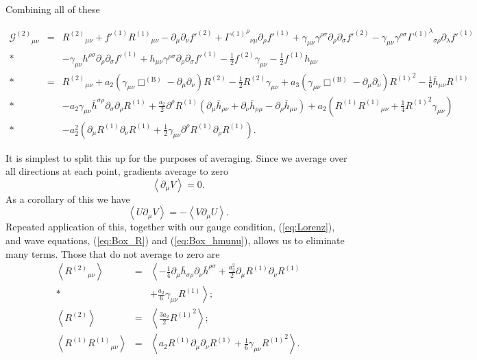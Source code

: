 \documentclass[aps,prd,amsfonts,amssymb,amsmath,nofootinbib,reprint,showpacs]{revtex4-1}
\newcommand{\eqnref}[1]{(\ref{eq:#1})}
\newcommand{\recip}[1]{\ensuremath{\frac{1}{#1}}}
\begin{document}
Combining all of these
\begin{widetext}
\begin{eqnarray}
{\mathcal{G}^{(2)}}_{\mu\nu} & = & {R^{(2)}}_{\mu\nu} + f'^{(1)}{R^{(1)}}_{\mu\nu} - \partial_\mu\partial_\nu f'^{(2)} + {{\Gamma^{(1)}}^\rho}_{\nu\mu}\partial_\rho f'^{(1)} + \gamma_{\mu\nu}\gamma^{\rho\sigma}\partial_\rho\partial_\sigma f'^{(2)} - \gamma_{\mu\nu}\gamma^{\rho\sigma}{{\Gamma^{(1)}}^\lambda}_{\sigma\rho}\partial_\lambda f'^{(1)} \nonumber \\*
 & & - {} \gamma_{\mu\nu}h^{\rho\sigma}\partial_\rho\partial_\sigma f'^{(1)} + h_{\mu\nu}\gamma^{\rho\sigma}\partial_\rho\partial_\sigma f'^{(1)} - \recip{2}f^{(2)}\gamma_{\mu\nu} - \recip{2}f^{(1)}h_{\mu\nu} \nonumber \\*
 & = & {R^{(2)}}_{\mu\nu} + a_2\left(\gamma_{\mu\nu}\Box^{(\text{B})} - \partial_\mu\partial_\nu\right)R^{(2)} - \recip{2}R^{(2)}\gamma_{\mu\nu} + a_3\left(\gamma_{\mu\nu}\Box^{(\text{B})} - \partial_\mu\partial_\nu\right){R^{(1)}}^2 - \recip{6}\overline{h}_{\mu\nu}R^{(1)} \nonumber \\*
 & & - {} a_2\gamma_{\mu\nu}\overline{h}^{\sigma\rho}\partial_\sigma\partial_\rho R^{(1)} + \frac{a_2}{2} \partial^\rho R^{(1)} \left(\partial_\mu\overline{h}_{\rho\nu} + \partial_\nu\overline{h}_{\rho\mu} - \partial_\rho\overline{h}_{\mu\nu}\right) + a_2\left(R^{(1)}{R^{(1)}}_{\mu\nu} + \recip{4}{R^{(1)}}^2\gamma_{\mu\nu}\right) \nonumber \\*
 & & - {} a_2^2\left(\partial_\mu R^{(1)}\partial_\nu R^{(1)} + \recip{2} \gamma_{\mu\nu}\partial^\rho R^{(1)}\partial_\rho R^{(1)}\right).
\end{eqnarray}
\end{widetext}
It is simplest to split this up for the purposes of averaging. Since we average over all directions at each point, gradients average to zero~\cite{Hobson2006}
\begin{equation}
\left\langle\partial_\mu V\right\rangle = 0.
\end{equation}
As a corollary of this we have
\begin{equation}
\left\langle U\partial_\mu V\right\rangle = -\left\langle V \partial_\mu U\right\rangle.
\end{equation}
Repeated application of this, together with our gauge condition, \eqnref{Lorenz}, and wave equations, \eqnref{Box_R} and \eqnref{Box_hmunu}, allows us to eliminate many terms. Those that do not average to zero are
\begin{eqnarray}
\left\langle {R^{(2)}}_{\mu\nu} \right\rangle & = & \left\langle -\recip{4} \partial_\mu\overline{h}_{\sigma\rho}\partial_\nu\overline{h}^{\rho\sigma} + \frac{a_2^2}{2}\partial_\mu R^{(1)}\partial_\nu R^{(1)} \right. \nonumber \\* 
 & & + \left. \frac{a_2}{6}\gamma_{\mu\nu}R^{(1)} \right\rangle; \\
\left\langle R^{(2)} \right\rangle & = & \left\langle \frac{3a_2}{2}{R^{(1)}}^2 \right\rangle; \\
\left\langle R^{(1)}{R^{(1)}}_{\mu\nu} \right\rangle & = & \left\langle a_2 R^{(1)} \partial_\mu\partial_\nu R^{(1)} + \recip{6}\gamma_{\mu\nu}{R^{(1)}}^2\right\rangle.
\end{eqnarray}
\end{document}
